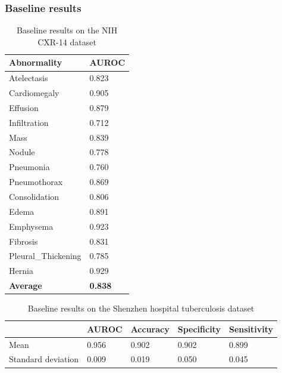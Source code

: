\documentclass[8pt]{beamer}
\begin{document}
      \begin{frame}
        \frametitle{Baseline results}
        \begin{table}[]
          \centering
          \begin{tabular}{@{}ll@{}}
            \toprule
            \textbf{Abnormality} & \textbf{AUROC} \\ \midrule
            Atelectasis          & 0.823          \\ \midrule
            Cardiomegaly         & 0.905          \\ \midrule
            Effusion             & 0.879          \\ \midrule
            Infiltration         & 0.712 \\ \midrule
            Mass                 & 0.839          \\ \midrule
            Nodule               & 0.778 \\ \midrule
            Pneumonia            & 0.760          \\ \midrule
            Pneumothorax         & 0.869          \\ \midrule
            Consolidation        & 0.806 \\ \midrule
            Edema                & 0.891          \\ \midrule
            Emphysema            & 0.923          \\ \midrule
            Fibrosis             & 0.831 \\ \midrule
            Pleural\_Thickening  & 0.785          \\ \midrule
            Hernia               & 0.929          \\ \midrule
            \textbf{Average}     & \textbf{0.838}          \\ \bottomrule
          \end{tabular}
          \caption{Baseline results on the NIH CXR-14 dataset}
          \label{tab:baseline_nih}
        \end{table}

      \end{frame}
      \begin{frame}

\begin{table}[]
  \centering
  \begin{tabular}{@{}lllll@{}}
    \toprule
    & \textbf{AUROC} & \textbf{Accuracy} & \textbf{Specificity} & \textbf{Sensitivity} \\ \midrule
    Mean               & 0.956          & 0.902             & 0.902                & 0.899                \\ \midrule
    Standard deviation & 0.009          & 0.019             & 0.050                & 0.045                \\ \bottomrule
  \end{tabular}
  \caption{Baseline results on the Shenzhen hospital tuberculosis dataset}
  \label{tab:baseline_shenzhen}
\end{table}

\end{frame}
\end{document}
